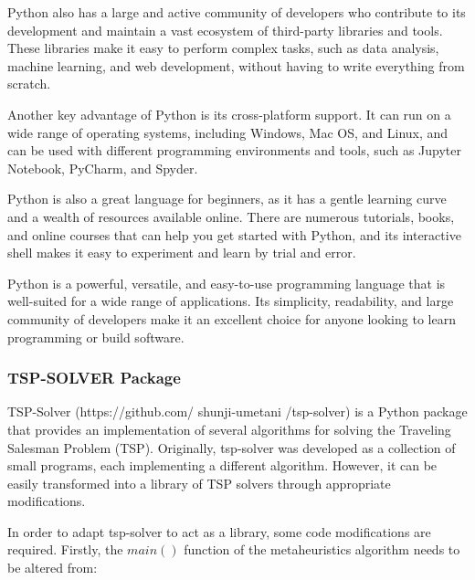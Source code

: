 \documentclass[conference]{IEEEtran}
\begin{document}
Python also has a large and active community of developers who contribute to its development and maintain a vast ecosystem of third-party libraries and tools. These libraries make it easy to perform complex tasks, such as data analysis, machine learning, and web development, without having to write everything from scratch.

Another key advantage of Python is its cross-platform support. It can run on a wide range of operating systems, including Windows, Mac OS, and Linux, and can be used with different programming environments and tools, such as Jupyter Notebook, PyCharm, and Spyder.

Python is also a great language for beginners, as it has a gentle learning curve and a wealth of resources available online. There are numerous tutorials, books, and online courses that can help you get started with Python, and its interactive shell makes it easy to experiment and learn by trial and error.

Python is a powerful, versatile, and easy-to-use programming language that is well-suited for a wide range of applications. Its simplicity, readability, and large community of developers make it an excellent choice for anyone looking to learn programming or build software.

\subsubsection{TSP-SOLVER Package}

 TSP-Solver (https://github.com/ shunji-umetani /tsp-solver) is a Python package that provides an implementation of several algorithms for solving the Traveling Salesman Problem (TSP). Originally, tsp-solver was developed as a collection of small programs, each implementing a different algorithm. However, it can be easily transformed into a library of TSP solvers through appropriate modifications. 
 
In order to adapt tsp-solver to act as a library, some code modifications are required. Firstly, the $main()$ function of the metaheuristics algorithm needs to be altered from:
 
\end{document}
